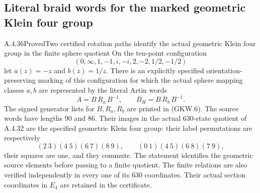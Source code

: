 \subsection{Literal braid words for the marked geometric Klein four group}

\begin{result}{A.4.36}{Proved}{Two certified rotation paths identify the actual geometric Klein four group in the finite sphere quotient}
\label{thm:sphere10-geometric-klein-words}
On the ten-point configuration
\[
 (0,\infty,1,-1,i,-i,2,-2,1/2,-1/2)
                                                               \tag{GKW.1}
\]
let $a(z)=-z$ and $b(z)=1/z$.  There is an explicitly
specified orientation-preserving marking of this configuration
for which the actual sphere mapping classes $a,b$ are
represented by the literal Artin words
\[
                  A=B\,R_a\,B^{-1},\qquad
                  B_H=B\,R_b\,B^{-1}.
                                                               \tag{GKW.2}
\]
The signed generator lists for $B,R_a,R_b$ are printed in
(GKW.6).  The source words have lengths $90$ and $86$.
Their images in the actual $630$-state quotient of A.4.32
are the specified geometric Klein four group: their
label permutations are respectively
\[
 (2\ 3)(4\ 5)(6\ 7)(8\ 9),\qquad
 (0\ 1)(4\ 5)(6\ 8)(7\ 9),
                                                               \tag{GKW.3}
\]
their squares are one, and they commute.
The statement identifies the geometric source elements
before passing to a finite quotient.  The finite relations
are also verified independently in every one of its $630$
coordinates.  Their actual section coordinates in $E_4$
are retained in the certificate.
\end{result}

